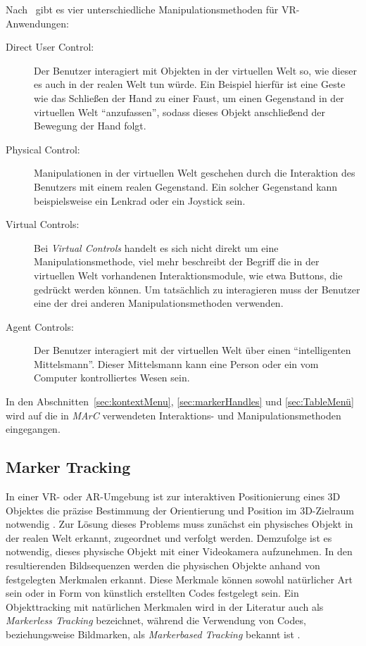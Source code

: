 Nach~\cite{sherman2002understanding} gibt es vier unterschiedliche Manipulationsmethoden für VR-An\-wen\-dung\-en:
\begin{description}
	\item[Direct User Control:] Der Benutzer interagiert mit Objekten in der virtuellen Welt so, wie dieser es auch in der realen Welt tun würde. Ein Beispiel hierfür ist eine Geste wie das Schließen der Hand zu einer Faust, um einen Gegenstand in der virtuellen Welt "`anzufassen"', sodass dieses Objekt anschließend der Bewegung der Hand folgt.
	\item[Physical Control:] Manipulationen in der virtuellen Welt geschehen durch die Interaktion des Benutzers mit einem realen Gegenstand. Ein solcher Gegenstand kann beispielsweise ein Lenkrad oder ein Joystick sein.
	\item[Virtual Controls:] Bei \emph{Virtual Controls} handelt es sich nicht direkt um eine Manipulationsmethode, viel mehr beschreibt der Begriff die in der virtuellen Welt vorhandenen Interaktionsmodule, wie etwa Buttons, die gedrückt werden können. Um tatsächlich zu interagieren muss der Benutzer eine der drei anderen Manipulationsmethoden verwenden.
	\item[Agent Controls:] Der Benutzer interagiert mit der virtuellen Welt über einen "`intelligenten Mittelsmann"'. Dieser Mittelsmann kann eine Person oder ein vom Computer kontrolliertes Wesen sein.
\end{description}
In den Abschnitten~\ref{sec:kontextMenu}, \ref{sec:markerHandles} und \ref{sec:TableMenü} wird auf die in \emph{MArC} verwendeten Interaktions- und Manipulationsmethoden eingegangen.

\subsection{Marker Tracking} \label{sec:MarkerTracking}
In einer VR- oder AR-Umgebung ist zur interaktiven Positionierung eines 3D Objektes die präzise Bestimmung der Orientierung und Position im 3D-Zielraum notwendig \cite{article:Aruco2014}. Zur Lösung dieses Problems muss zunächst ein physisches Objekt in der realen Welt erkannt, zugeordnet und verfolgt werden. Demzufolge ist es notwendig, dieses physische Objekt mit einer Videokamera aufzunehmen. In den resultierenden Bildsequenzen werden die physischen Objekte anhand von festgelegten Merkmalen erkannt. Diese Merkmale können sowohl natürlicher Art sein oder in Form von künstlich erstellten Codes festgelegt sein. Ein Objekttracking mit natürlichen Merkmalen wird in der Literatur auch als \textit{Markerless Tracking} bezeichnet, während die Verwendung von Codes, beziehungsweise Bildmarken, als \textit{Markerbased Tracking} bekannt ist \cite{article:MarkerLessBarandiaran2010}. 

